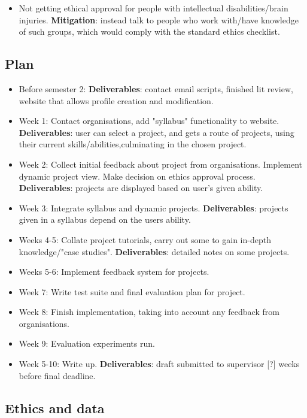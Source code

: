 \documentclass[11pt]{article}
\begin{document}
\begin{itemize}
    \item Not getting ethical approval for people with intellectual disabilities/brain injuries. \textbf{Mitigation}: instead talk to people who work with/have knowledge of such groups, which would comply with the standard ethics checklist. 
\end{itemize}

\subsection{Plan}\label{plan}

\begin{itemize}
    \item Before semester 2: \textbf{Deliverables}: contact email scripts, finished lit review, website that allows profile creation and modification.
    \item Week 1: Contact organisations, add "syllabus" functionality to website. \textbf{Deliverables}: user can select a project, and gets a route of projects, using their current skills/abilities,culminating in the chosen project. 
    \item Week 2: Collect initial feedback about project from organisations. Implement dynamic project view. Make decision on ethics approval process. \textbf{Deliverables}: projects are displayed based on user's given ability. 
    \item Week 3: Integrate syllabus and dynamic projects. \textbf{Deliverables}: projects given in a syllabus depend on the users ability.  
    \item Weeks 4-5: Collate project tutorials, carry out some to gain in-depth knowledge/"case studies". \textbf{Deliverables}: detailed notes on some projects. 
    \item Weeks 5-6: Implement feedback system for projects.
    \item Week 7: Write test suite and final evaluation plan for project.
    \item Week 8: Finish implementation, taking into account any feedback from organisations. 
    \item Week 9: Evaluation experiments run. 
    \item Week 5-10: Write up. \textbf{Deliverables}: draft submitted to supervisor [?] weeks before final deadline. 
\end{itemize}

\subsection{Ethics and data}\label{ethics}
\end{document}

